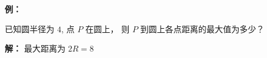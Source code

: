 \begin{examplebox}
\textbf{例：}

已知圆半径为 $4$,
点 $P$ 在圆上，
则 $P$ 到圆上各点距离的最大值为多少？

\textbf{解：} 最大距离为 $2R=8$
\end{examplebox}
